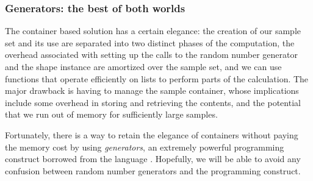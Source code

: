 
\subsubsection{Generators: the best of both worlds}
\label{sec:classes:generators}

The container based solution has a certain elegance: the creation of our sample set and its use
are separated into two distinct phases of the computation, the overhead associated with setting
up the calls to the random number generator and the shape instance are amortized over the
sample set, and we can use functions that operate efficiently on lists to perform parts of the
calculation. The major drawback is having to manage the sample container, whose implications
include some overhead in storing and retrieving the contents, and the potential that we run out
of memory for sufficiently large samples.

Fortunately, there is a way to retain the elegance of containers without paying the memory cost
by using {\em generators}, an extremely powerful programming construct borrowed from the
language \supercite{icon}. Hopefully, we will be able to avoid any confusion
between random number generators and the programming construct.

